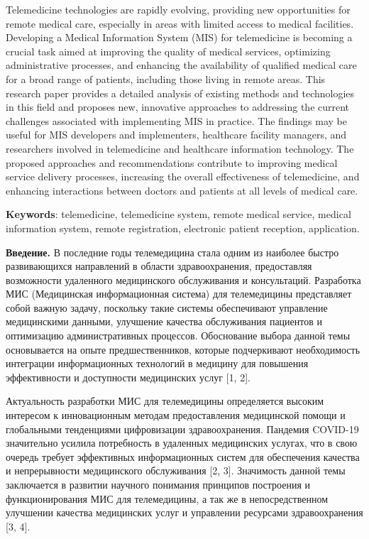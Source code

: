 Telemedicine technologies are rapidly evolving, providing new
opportunities for remote medical care, especially in areas with limited
access to medical facilities. Developing a Medical Information System
(MIS) for telemedicine is becoming a crucial task aimed at improving the
quality of medical services, optimizing administrative processes, and
enhancing the availability of qualified medical care for a broad range
of patients, including those living in remote areas. This research paper
provides a detailed analysis of existing methods and technologies in
this field and proposes new, innovative approaches to addressing the
current challenges associated with implementing MIS in practice. The
findings may be useful for MIS developers and implementers, healthcare
facility managers, and researchers involved in telemedicine and
healthcare information technology. The proposed approaches and
recommendations contribute to improving medical service delivery
processes, increasing the overall effectiveness of telemedicine, and
enhancing interactions between doctors and patients at all levels of
medical care.

{\bfseries Keywords}: telemedicine, telemedicine system, remote medical
service, medical information system, remote registration, electronic
patient reception, application.

{\bfseries Введение.} В последние годы телемедицина стала одним из наиболее
быстро развивающихся направлений в области здравоохранения, предоставляя
возможности удаленного медицинского обслуживания и консультаций.
Разработка МИС (Медицинская информационная система) для телемедицины
представляет собой важную задачу, поскольку такие системы обеспечивают
управление медицинскими данными, улучшение качества обслуживания
пациентов и оптимизацию административных процессов. Обоснование выбора
данной темы основывается на опыте предшественников, которые подчеркивают
необходимость интеграции информационных технологий в медицину для
повышения эффективности и доступности медицинских услуг {[}1, 2{]}.

Актуальность разработки МИС для телемедицины определяется высоким
интересом к инновационным методам предоставления медицинской помощи и
глобальными тенденциями цифровизации здравоохранения. Пандемия COVID-19
значительно усилила потребность в удаленных медицинских услугах, что в
свою очередь требует эффективных информационных систем для обеспечения
качества и непрерывности медицинского обслуживания {[}2, 3{]}.
Значимость данной темы заключается в развитии научного понимания
принципов построения и функционирования МИС для телемедицины, а так же в
непосредственном улучшении качества медицинских услуг и управлении
ресурсами здравоохранения {[}3, 4{]}.

